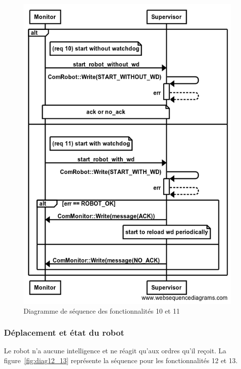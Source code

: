\begin{figure}[htbp]
\begin{center}
\includegraphics[scale=0.4]{./seq_req/req10-11}
\caption{Diagramme de séquence des fonctionnalités 10 et 11}
\label{fig:diag10_11}
\end{center}
\end{figure}
\FloatBarrier

\subsubsection{Déplacement et état du robot}

Le robot n'a aucune intelligence et ne réagit qu'aux ordres qu'il reçoit.  La figure~\ref{fig:diag12_13} représente la séquence pour les fonctionnalités 12 et 13.

